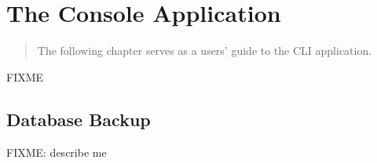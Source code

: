 \documentclass[deska]{subfiles}
\begin{document}
\chapter{The Console Application}
\label{sec:usage-cli}

\begin{abstract}
The following chapter serves as a users' guide to the CLI application.
\end{abstract}

FIXME

\section{Database Backup}
\label{sec:cli-db-backup}

FIXME: describe me
\end{document}

